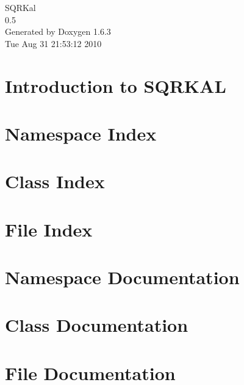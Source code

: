 \documentclass[a4paper]{book}
\begin{document}
\hypersetup{pageanchor=false}
\begin{titlepage}
\vspace*{7cm}
\begin{center}
{\Large SQRKal \\[1ex]\large 0.5 }\\
\vspace*{1cm}
{\large Generated by Doxygen 1.6.3}\\
\vspace*{0.5cm}
{\small Tue Aug 31 21:53:12 2010}\\
\end{center}
\end{titlepage}
\clearemptydoublepage
{}
\tableofcontents
\clearemptydoublepage
{}
\hypersetup{pageanchor=true}
\chapter{Introduction to SQRKAL}
\label{index}\hypertarget{index}{}
\chapter{Namespace Index}

\chapter{Class Index}

\chapter{File Index}

\chapter{Namespace Documentation}

\chapter{Class Documentation}











\chapter{File Documentation}





















\printindex
\end{document}
